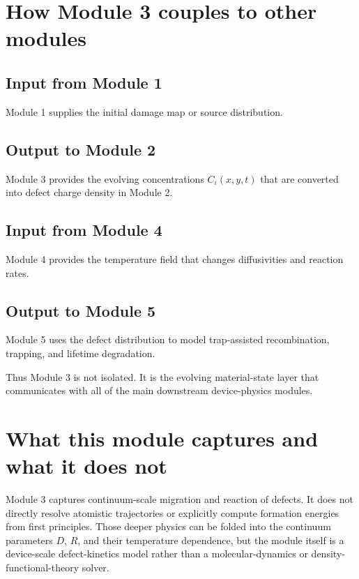\documentclass[11pt]{article}
\begin{document}
\section{How Module 3 couples to other modules}

\subsection{Input from Module 1}

Module 1 supplies the initial damage map or source distribution.

\subsection{Output to Module 2}

Module 3 provides the evolving concentrations $C_i(x,y,t)$ that are converted into defect charge density in Module 2.

\subsection{Input from Module 4}

Module 4 provides the temperature field that changes diffusivities and reaction rates.

\subsection{Output to Module 5}

Module 5 uses the defect distribution to model trap-assisted recombination, trapping, and lifetime degradation.

Thus Module 3 is not isolated. It is the evolving material-state layer that communicates with all of the main downstream device-physics modules.

\section{What this module captures and what it does not}

Module 3 captures continuum-scale migration and reaction of defects. It does not directly resolve atomistic trajectories or explicitly compute formation energies from first principles. Those deeper physics can be folded into the continuum parameters $D$, $R$, and their temperature dependence, but the module itself is a device-scale defect-kinetics model rather than a molecular-dynamics or density-functional-theory solver.
\end{document}
